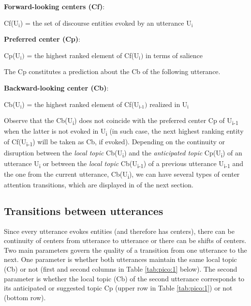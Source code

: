 \documentclass[output=paper
,modfonts
,nonflat]{langsci/langscibook}
\begin{document}
\vspace{.12in}
\textbf{Forward-looking centers (Cf)}:

\vspace{.12in}
Cf(U$_\text{i}$) = the set of discourse entities evoked by an utterance U$_\text{i}$
\vspace{.12in}


\textbf{Preferred center (Cp)}:

\vspace{.12in}
Cp(U$_\text{i})$ = the highest ranked element of Cf(U$_\text{i})$ in terms of salience

The Cp constitutes a prediction about the Cb of the following utterance.

\vspace{.12in}

\vspace{.12in}
\textbf{Backward-looking center (Cb)}:


\vspace{.12in}
Cb(U$_\text{i}$) = the highest ranked element of Cf(U$_\text{i-1})$ realized in U$_\text{i}$

\vspace{.12in}
Observe that the Cb(U\textsubscript{i}) does not coincide with the preferred center Cp of U\textsubscript{i-1} when the latter is not evoked in U\textsubscript{i} (in such case, the next highest ranking entity of Cf(U\textsubscript{i-1}) will be taken as Cb, if evoked). Depending on the continuity or disruption between the \textit{local topic} Cb(U\textsubscript{i}) and the \textit{anticipated topic} Cp(U\textsubscript{i}) of an utterance U\textsubscript{i} or between the \textit{local topic} Cb(U\textsubscript{i-1}) of a previous utterance U\textsubscript{i-1} and the one from the current utterance, Cb(U\textsubscript{i}), we can have several types of center attention transitions, which are displayed in  of the next section.


\subsection{Transitions between utterances}\label{sec:pico:3.3}

Since every utterance evokes entities (and therefore has centers), there can be continuity of centers from utterance to utterance or there can be shifts of centers. Two main parameters govern the quality of a transition from one utterance to the next. One parameter is whether both utterances maintain the same local topic (Cb) or not (first and second columns in Table \ref{tab:pico:1} below). The second parameter is whether the local topic (Cb) of the second utterance corresponds to its anticipated \largerpage or suggested topic Cp (upper row in Table \ref{tab:pico:1}) or not (bottom row). \largerpage
\end{document}
